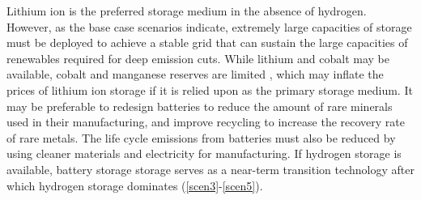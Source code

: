 Lithium ion is the preferred storage medium in the absence of hydrogen. However, as the base case scenarios indicate, extremely large capacities of storage must be deployed to achieve a stable grid that can sustain the large capacities of renewables required for deep emission cuts. While lithium and cobalt may be available, cobalt and manganese reserves are limited \cite{scrosati_lithium-ion_2011,simon_potential_2015,turcheniuk_ten_2018} , which may inflate the prices of lithium ion storage if it is relied upon as the primary storage medium. It may be preferable to redesign batteries to reduce the amount of rare minerals used in their manufacturing, and improve recycling to increase the recovery rate of rare metals. The life cycle emissions from batteries must also be reduced by using cleaner materials and electricity for manufacturing. If hydrogen storage is available, battery storage storage serves as a near-term transition technology after which hydrogen storage dominates (\ref{scen3}-\ref{scen5}).

